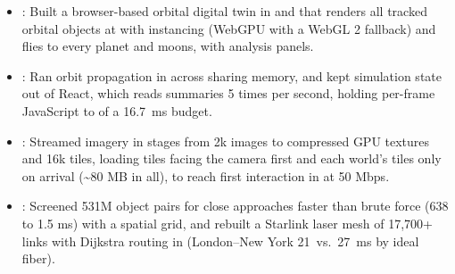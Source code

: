\begin{itemize}
  \item {}: Built a browser-based orbital digital twin in  and  that renders all  tracked orbital objects at  with instancing (WebGPU with a WebGL 2 fallback) and flies to every planet and  moons, with  analysis panels.
  \item {}: Ran orbit propagation in  across  sharing memory, and kept simulation state out of React, which reads  summaries 5 times per second, holding per-frame JavaScript to  of a 16.7~ms budget.
  \item {}: Streamed imagery in stages from 2k images to compressed GPU textures and 16k tiles, loading tiles facing the camera first and each world's tiles only on arrival (\textasciitilde80 MB in all), to reach first interaction in  at 50 Mbps.
  \item {}: Screened 531M object pairs for close approaches \resumeEmphasis{423\ensuremath{\times}} faster than brute force (638 to 1.5 ms) with a spatial grid, and rebuilt a Starlink laser mesh of 17,700+ links with Dijkstra routing in  (London--New York 21~vs.\ 27~ms by ideal fiber).
\end{itemize}
